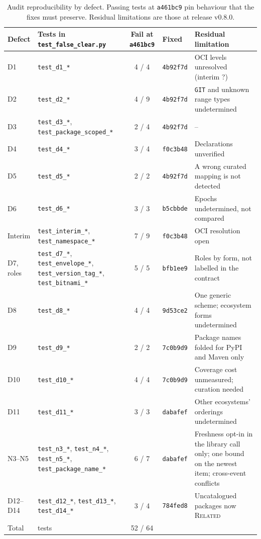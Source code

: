\documentclass[11pt,a4paper]{article}
\newcommand{\code}[1]{\texttt{#1}}
\newcommand{\Ind}{\textsf{?}}
\newcommand{\commit}{\code{a461bc9}}
\newcommand{\fixcommit}{\code{4b92f7d}}
\newcommand{\dsixcommit}{\code{b5cbbde}}
\newcommand{\dfourcommit}{\code{f0c3b48}}
\newcommand{\deightcommit}{\code{9d53ce2}}
\newcommand{\dninecommit}{\code{7c0b9d9}}
\newcommand{\delevencommit}{\code{dabafef}}
\newcommand{\dsevencommit}{\code{bfb1ee9}}
\newcommand{\dtwelvecommit}{\code{784fed8}}
\newcommand{\release}{v0.8.0}
\begin{document}
\begin{table}[h]
\centering
\footnotesize
\begin{tabularx}{\linewidth}{@{}l >{\raggedright\arraybackslash}p{3.4cm} c l >{\raggedright\arraybackslash}X@{}}
\toprule
Defect & Tests in \code{test\_false\_clear.py} & Fail at \commit{} & Fixed & Residual limitation \\
\midrule
D1 & \code{test\_d1\_*} & 4 / 4 & \fixcommit{} & OCI levels unresolved (interim \Ind{}) \\
D2 & \code{test\_d2\_*} & 4 / 9 & \fixcommit{} & \code{GIT} and unknown range types undetermined \\
D3 & \code{test\_d3\_*}, \code{test\_package\_\allowbreak scoped\_*} & 2 / 4 & \fixcommit{} & -- \\
D4 & \code{test\_d4\_*} & 3 / 4 & \dfourcommit{} & Declarations unverified \\
D5 & \code{test\_d5\_*} & 2 / 2 & \fixcommit{} & A wrong curated mapping is not detected \\
D6 & \code{test\_d6\_*} & 3 / 3 & \dsixcommit{} & Epochs undetermined, not compared \\
Interim & \code{test\_interim\_*}, \code{test\_namespace\_*} & 7 / 9 & \dfourcommit{} & OCI resolution open \\
D7, roles & \code{test\_d7\_*}, \code{test\_envelope\_*}, \code{test\_version\_\allowbreak tag\_*}, \code{test\_bitnami\_*} & 5 / 5 & \dsevencommit{} & Roles by form, not labelled in the contract \\
D8 & \code{test\_d8\_*} & 4 / 4 & \deightcommit{} & One generic scheme; ecosystem forms undetermined \\
D9 & \code{test\_d9\_*} & 2 / 2 & \dninecommit{} & Package names folded for PyPI and Maven only \\
D10 & \code{test\_d10\_*} & 4 / 4 & \dninecommit{} & Coverage cost unmeasured; curation needed \\
D11 & \code{test\_d11\_*} & 3 / 3 & \delevencommit{} & Other ecosystems' orderings undetermined \\
N3--N5 & \code{test\_n3\_*}, \code{test\_n4\_*}, \code{test\_n5\_*}, \code{test\_package\_\allowbreak name\_*} & 6 / 7 & \delevencommit{} & Freshness opt-in in the library call only; one bound on the newest item; cross-event conflicts \\
D12--D14 & \code{test\_d12\_*}, \code{test\_d13\_*}, \code{test\_d14\_*} & 3 / 4 & \dtwelvecommit{} & Uncatalogued packages now \textsc{Related} \\
\midrule
Total & 64 tests & 52 / 64 & & \\
\bottomrule
\end{tabularx}
\caption{Audit reproducibility by defect. Passing tests at \commit{}
pin behaviour that the fixes must preserve. Residual limitations are
those at release \release{}.}
\label{tab:repro}
\end{table}
\end{document}
